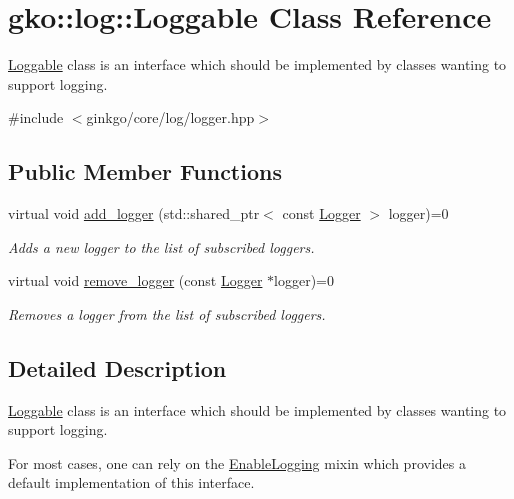 \hypertarget{classgko_1_1log_1_1Loggable}{}\section{gko\+:\+:log\+:\+:Loggable Class Reference}
\label{classgko_1_1log_1_1Loggable}


\hyperlink{classgko_1_1log_1_1Loggable}{Loggable} class is an interface which should be implemented by classes wanting to support logging.  




{\ttfamily \#include $<$ginkgo/core/log/logger.\+hpp$>$}

\subsection*{Public Member Functions}
\begin{DoxyCompactItemize}
\item 
virtual void \hyperlink{classgko_1_1log_1_1Loggable_aa2bb887b5ef7e75fa1a30ee1896ed932}{add\+\_\+logger} (std\+::shared\+\_\+ptr$<$ const \hyperlink{classgko_1_1log_1_1Logger}{Logger} $>$ logger)=0
\begin{DoxyCompactList}\small\item\em Adds a new logger to the list of subscribed loggers. \end{DoxyCompactList}\item 
virtual void \hyperlink{classgko_1_1log_1_1Loggable_a5de4092a74cf04f30f13636d49aaec8b}{remove\+\_\+logger} (const \hyperlink{classgko_1_1log_1_1Logger}{Logger} $\ast$logger)=0
\begin{DoxyCompactList}\small\item\em Removes a logger from the list of subscribed loggers. \end{DoxyCompactList}\end{DoxyCompactItemize}


\subsection{Detailed Description}
\hyperlink{classgko_1_1log_1_1Loggable}{Loggable} class is an interface which should be implemented by classes wanting to support logging. 

For most cases, one can rely on the \hyperlink{classgko_1_1log_1_1EnableLogging}{Enable\+Logging} mixin which provides a default implementation of this interface. 


